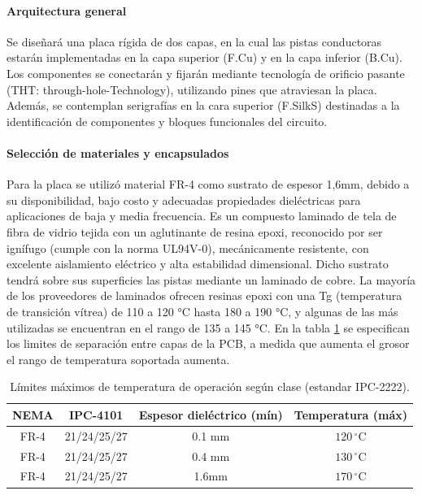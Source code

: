 \documentclass[]{article}
\begin{document}
	 

	 
	\paragraph{Arquitectura general}
	
	Se diseñará una placa rígida de dos capas, en la cual las pistas conductoras estarán implementadas en la capa superior (F.Cu) y en la capa inferior (B.Cu). Los componentes se conectarán y fijarán mediante tecnología de orificio pasante (THT: through-hole-Technology), utilizando pines que atraviesan la placa. Además, se contemplan serigrafías en la cara superior (F.SilkS) destinadas a la identificación de componentes y bloques funcionales del circuito.
	
	
	\paragraph{Selección de materiales y encapsulados}
	
	Para la placa se utilizó material FR-4 como sustrato de espesor 1,6mm, debido a su disponibilidad, bajo costo y adecuadas propiedades dieléctricas para aplicaciones de baja y media frecuencia. Es un compuesto laminado de tela de fibra de vidrio tejida con un aglutinante de resina epoxi, reconocido por ser ignífugo (cumple con la norma UL94V-0), mecánicamente resistente, con excelente aislamiento eléctrico y alta estabilidad dimensional. Dicho sustrato tendrá sobre sus superficies las pistas mediante un laminado de cobre. La mayoría de los proveedores de laminados ofrecen resinas epoxi con una Tg (temperatura de transición vítrea) de 110 a 120 °C hasta 180 a 190 °C, y algunas de las más utilizadas se encuentran en el rango de 135 a 145 °C. En la tabla \ref{tab:limites_espesor} se especifican los limites de separación entre capas de la PCB, a medida que aumenta el grosor el rango de temperatura soportada aumenta.
	
	
	
	\begin{table}[h]
		\centering
		\caption{Límites máximos de temperatura de operación según clase (estandar IPC-2222).}
		\label{tab:limites_espesor}
		\begin{tabular}{|c|c|c|c|}
			\hline
			\textbf{NEMA} & \textbf{IPC-4101} & \textbf{Espesor dieléctrico (mín)} & \textbf{Temperatura (máx)} \\
			\hline
				FR-4 & 21/24/25/27 & 0.1 mm & $120\,^\circ\mathrm{C}$ \\
			\hline
				FR-4 & 21/24/25/27 & 0.4 mm & $130\,^\circ\mathrm{C}$\\
			\hline
				FR-4 & 21/24/25/27 & 1.6mm & $170\,^\circ\mathrm{C}$\\
			\hline
		\end{tabular}
	\end{table}
	
\end{document}
